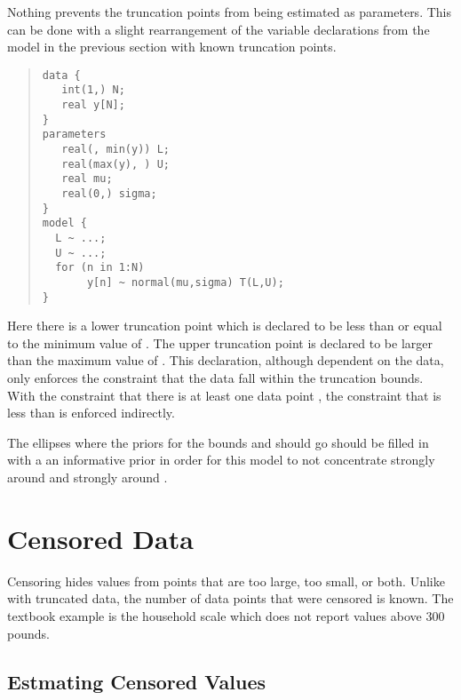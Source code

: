 Nothing prevents the truncation points from being estimated as
parameters.  This can be done with a slight rearrangement of the
variable declarations from the model in the previous section with known
truncation points.
%
\begin{quote}
\begin{Verbatim}
data {
   int(1,) N;
   real y[N];
}
parameters
   real(, min(y)) L; 
   real(max(y), ) U;
   real mu;
   real(0,) sigma;
}
model {
  L ~ ...;  
  U ~ ...;
  for (n in 1:N)
       y[n] ~ normal(mu,sigma) T(L,U);
}
\end{Verbatim}
\end{quote}
%
Here there is a lower truncation point  which is declared to
be less than or equal to the minimum value of .  The upper
truncation point  is declared to be larger than the maximum
value of .  This declaration, although dependent on the data,
only enforces the constraint that the data fall within the
truncation bounds.  With the constraint that there is at least one
data point , the constraint that  is less than
 is enforced indirectly.

The ellipses where the priors for the bounds  and 
should go should be filled in with a an informative prior in
order for this model to not concentrate  strongly around 
 and  strongly around .


\section{Censored Data}

Censoring hides values from points that are too large, too small, or
both.  Unlike with truncated data, the number of data points that were
censored is known.  The textbook example is the household scale which
does not report values above 300 pounds.  

\subsection{Estmating Censored Values}

